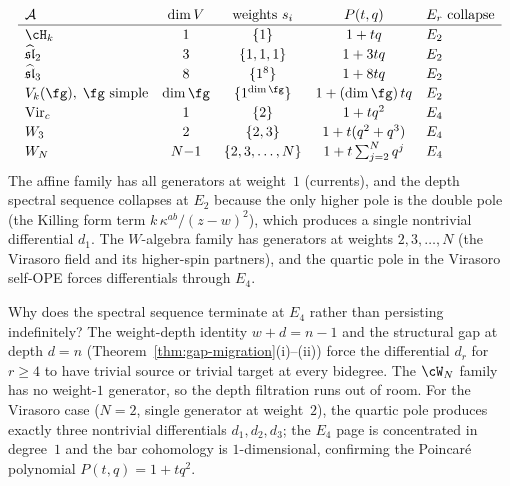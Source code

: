 \begin{computation}
\label{comp:concentration-data}
\[
\renewcommand{\arraystretch}{1.15}
\begin{array}{lcccl}
\cA & \dim V & \text{weights } s_i
 & P(t,q)
 & \text{$E_r$ collapse} \\
\hline
\cH_k & 1 & \{1\}
 & 1+tq & E_2 \\
\widehat{\mathfrak{sl}}_2 & 3 & \{1,1,1\}
 & 1+3tq & E_2 \\
\widehat{\mathfrak{sl}}_3 & 8 & \{1^8\}
 & 1+8tq & E_2 \\
V_k(\fg),\;\fg\text{ simple} & \dim\fg & \{1^{\dim\fg}\}
 & 1+(\dim\fg)\,tq & E_2 \\
\mathrm{Vir}_c & 1 & \{2\}
 & 1+tq^2 & E_4 \\
W_3 & 2 & \{2,3\}
 & 1+t(q^2+q^3) & E_4 \\
W_N & N{-}1 & \{2,3,\ldots,N\}
 & 1+t\sum_{j=2}^N q^j & E_4
\end{array}
\]
The affine family has all generators at weight~$1$
(currents), and the depth spectral sequence collapses at
$E_2$ because the only higher pole is the double pole
(the Killing form term $k\,\kappa^{ab}/(z{-}w)^2$), which
produces a single nontrivial differential $d_1$. The
$W$-algebra family has generators at weights
$2,3,\ldots,N$ (the Virasoro field and its higher-spin
partners), and the quartic pole in the Virasoro self-OPE
forces differentials through $E_4$.

Why does the spectral sequence terminate at $E_4$
rather than persisting indefinitely? The
weight-depth identity $w + d = n - 1$ and the
structural gap at depth $d = n$
(Theorem~\ref{thm:gap-migration}(i)--(ii))
force the differential $d_r$ for $r \ge 4$ to have
trivial source or trivial target at every bidegree.
The $\cW_N$ family has no weight-$1$ generator, so the
depth filtration runs out of room. For the Virasoro
case ($N = 2$, single generator at weight~$2$), the
quartic pole produces exactly three nontrivial
differentials $d_1, d_2, d_3$; the $E_4$ page is
concentrated in degree~$1$ and the bar cohomology is
$1$-dimensional, confirming the Poincar\'e polynomial
$P(t,q) = 1 + tq^2$.
\end{computation}

